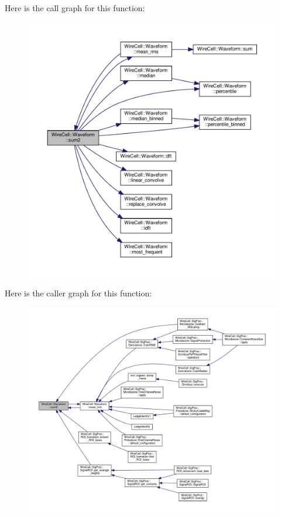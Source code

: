 Here is the call graph for this function\+:
\nopagebreak
\begin{figure}[H]
\begin{center}
\leavevmode
\includegraphics[width=350pt]{namespace_wire_cell_1_1_waveform_a6aa0cf31fb8548b1f74ffb3f77350668_cgraph}
\end{center}
\end{figure}
Here is the caller graph for this function\+:
\nopagebreak
\begin{figure}[H]
\begin{center}
\leavevmode
\includegraphics[width=350pt]{namespace_wire_cell_1_1_waveform_a6aa0cf31fb8548b1f74ffb3f77350668_icgraph}
\end{center}
\end{figure}
